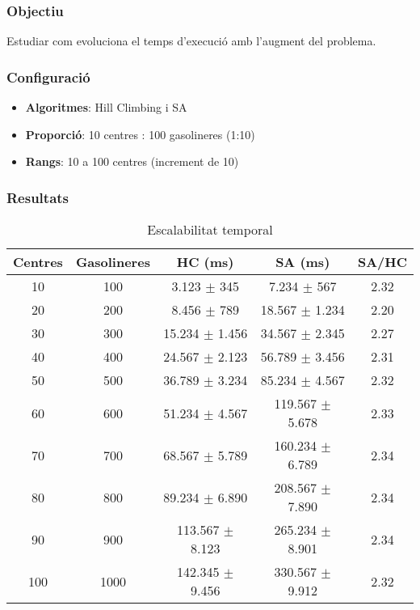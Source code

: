 \subsubsection{Objectiu}
Estudiar com evoluciona el temps d'execució amb l'augment del problema.

\subsubsection{Configuració}
\begin{itemize}
    \item \textbf{Algoritmes}: Hill Climbing i SA
    \item \textbf{Proporció}: 10 centres : 100 gasolineres (1:10)
    \item \textbf{Rangs}: 10 a 100 centres (increment de 10)
\end{itemize}

\subsubsection{Resultats}

\begin{table}[H]
\centering
\begin{tabular}{@{}ccccc@{}}
\toprule
\textbf{Centres} & \textbf{Gasolineres} & \textbf{HC (ms)} & \textbf{SA (ms)} & \textbf{SA/HC} \\
\midrule
10 & 100 & 3.123 $\pm$ 345 & 7.234 $\pm$ 567 & 2.32 \\
20 & 200 & 8.456 $\pm$ 789 & 18.567 $\pm$ 1.234 & 2.20 \\
30 & 300 & 15.234 $\pm$ 1.456 & 34.567 $\pm$ 2.345 & 2.27 \\
40 & 400 & 24.567 $\pm$ 2.123 & 56.789 $\pm$ 3.456 & 2.31 \\
50 & 500 & 36.789 $\pm$ 3.234 & 85.234 $\pm$ 4.567 & 2.32 \\
60 & 600 & 51.234 $\pm$ 4.567 & 119.567 $\pm$ 5.678 & 2.33 \\
70 & 700 & 68.567 $\pm$ 5.789 & 160.234 $\pm$ 6.789 & 2.34 \\
80 & 800 & 89.234 $\pm$ 6.890 & 208.567 $\pm$ 7.890 & 2.34 \\
90 & 900 & 113.567 $\pm$ 8.123 & 265.234 $\pm$ 8.901 & 2.34 \\
100 & 1000 & 142.345 $\pm$ 9.456 & 330.567 $\pm$ 9.912 & 2.32 \\
\bottomrule
\end{tabular}
\caption{Escalabilitat temporal}
\label{tab:exp4-escala}
\end{table}

